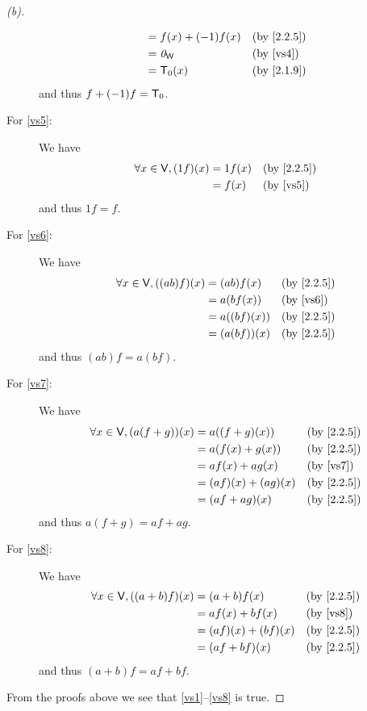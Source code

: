 \begin{proof}[(b)]
\begin{description}
\begin{align*}
                                           & = f(x) + (-1)f(x)   &  & \by{2.2.5}            \\
                                           & = \zv_{\W}          &  & \text{(by \ref{vs4})} \\
                                           & = \zT(x)            &  & \by{2.1.9}
      \end{align*}
      and thus \(f + (-1)f = \mathsf{T}_0\).
    \item[For \ref{vs5}:] We have
      \begin{align*}
        \forall x \in \V, (1f)(x) & = 1f(x) &  & \by{2.2.5}            \\
                                  & = f(x)  &  & \text{(by \ref{vs5})}
      \end{align*}
      and thus \(1f = f\).
    \item[For \ref{vs6}:] We have
      \begin{align*}
        \forall x \in \V, ((ab)f)(x) & = (ab) f(x)   &  & \by{2.2.5}            \\
                                     & = a (bf(x))   &  & \text{(by \ref{vs6})} \\
                                     & = a ((bf)(x)) &  & \by{2.2.5}            \\
                                     & = (a (bf))(x) &  & \by{2.2.5}
      \end{align*}
      and thus \((ab)f = a (bf)\).
    \item[For \ref{vs7}:] We have
      \begin{align*}
        \forall x \in \V, (a(f + g))(x) & = a((f + g)(x))     &  & \by{2.2.5}            \\
                                        & = a(f(x) + g(x))    &  & \by{2.2.5}            \\
                                        & = af(x) + ag(x)     &  & \text{(by \ref{vs7})} \\
                                        & = (af)(x) + (ag)(x) &  & \by{2.2.5}            \\
                                        & = (af + ag)(x)      &  & \by{2.2.5}
      \end{align*}
      and thus \(a(f + g) = af + ag\).
    \item[For \ref{vs8}:] We have
      \begin{align*}
        \forall x \in \V, ((a + b)f)(x) & = (a + b) f(x)      &  & \by{2.2.5}            \\
                                        & = af(x) + bf(x)     &  & \text{(by \ref{vs8})} \\
                                        & = (af)(x) + (bf)(x) &  & \by{2.2.5}            \\
                                        & = (af + bf)(x)      &  & \by{2.2.5}
      \end{align*}
      and thus \((a + b)f = af + bf\).
  \end{description}
  From the proofs above we see that \ref{vs1}--\ref{vs8} is true.


\end{proof}
